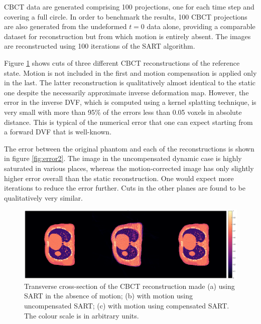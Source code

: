 CBCT data are generated comprising 100 projections, one for each time step and covering a full circle.  In order to benchmark the results, 100 CBCT projections are also generated from the undeformed $t=0$ data alone, providing a comparable dataset for reconstruction but from which motion is entirely absent.  The images are reconstructed using 100 iterations of the SART algorithm.

Figure \ref{fig:result21} shows cuts of three different CBCT reconstructions of the reference state.  Motion is not included in the first and motion compensation is applied only in the last.  The latter reconstruction is qualitatively almost identical to the static one despite the necessarily approximate inverse deformation map.  However, the error in the inverse DVF, which is computed using a kernel splatting technique, is very small with more than 95\% of the errors less than 0.05 voxels in absolute distance.  This is typical of the numerical error that one can expect starting from a forward DVF that is well-known.

The error between the original phantom and each of the reconstructions is shown in figure \ref{fig:error2}.  The image in the uncompensated dynamic case is highly saturated in various places, whereas the motion-corrected image has only slightly higher error overall than the static reconstruction.  One would expect more iterations to reduce the error further.  Cuts in the other planes are found to be qualitatively very similar.

\begin{figure}[H]
\begin{center}
\includegraphics[width=1\linewidth]{MotionCorrection/motion2XCAT.png}
\hspace{0.1cm}{\footnotesize (a)}\hspace{4.3cm}{\footnotesize (b)}\hspace{4.3cm}{\footnotesize (c)}
\caption{\label{fig:result21} Transverse cross-section of the CBCT reconstruction made (a) using SART in the absence of motion; (b) with motion using uncompensated SART; (c) with motion using compensated SART.  The colour scale is in arbitrary units.} 
\end{center}
\end{figure}

